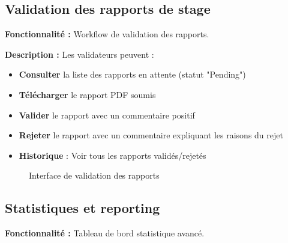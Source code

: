\documentclass[12pt,a4paper]{report}
\begin{document}
\subsection{Validation des rapports de stage}

\textbf{Fonctionnalité :} Workflow de validation des rapports.

\textbf{Description :} Les validateurs peuvent :

\begin{itemize}[leftmargin=1cm]
    \item \textbf{Consulter} la liste des rapports en attente (statut "Pending")
    \item \textbf{Télécharger} le rapport PDF soumis
    \item \textbf{Valider} le rapport avec un commentaire positif
    \item \textbf{Rejeter} le rapport avec un commentaire expliquant les raisons du rejet
    \item \textbf{Historique} : Voir tous les rapports validés/rejetés
\end{itemize}

\begin{figure}[H]
\centering
{}
\caption{Interface de validation des rapports}
\end{figure}

\subsection{Statistiques et reporting}

\textbf{Fonctionnalité :} Tableau de bord statistique avancé.
\end{document}
